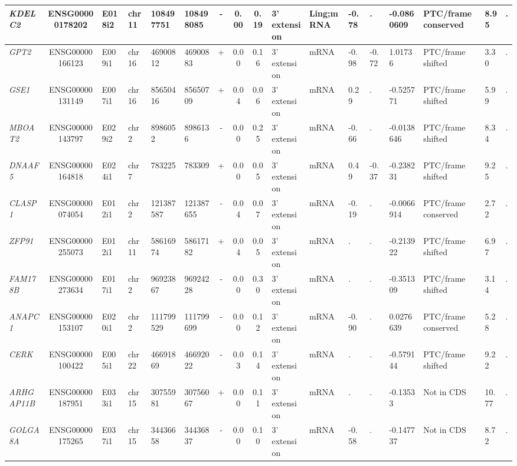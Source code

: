 \begin{appendices}
\begin{landscape}
\begin{table}
{\begin{tabular}{|l|c|l|l|l|l|c|c|c|l|l|l|l|l|l|l|l|}
		\textit{KDELC2} & ENSG00000178202 & E018i2 & chr11 & 108497751 & 108498085 & -     & 0.00  & 0.19  & 3' extension & Ling;mRNA & -0.78 & . & -0.0860609 & PTC/frame conserved & 8.95  & . \\ \hline
		\textit{GPT2} & ENSG00000166123 & E009i1 & chr16 & 46900812 & 46900883 & +     & 0.00  & 0.16  & 3' extension & mRNA  & -0.98 & -0.72 & 1.01736 & PTC/frame shifted & 3.30  & . \\ \hline
		\textit{GSE1} & ENSG00000131149 & E007i1 & chr16 & 85650416 & 85650709 & +     & 0.04  & 0.06  & 3' extension & mRNA  & 0.29  & . & -0.525771 & PTC/frame shifted & 5.99  & . \\ \hline
		\textit{MBOAT2} & ENSG00000143797 & E029i2 & chr2  & 8986052 & 8986136 & -     & 0.00  & 0.25  & 3' extension & mRNA  & -0.66 & . & -0.0138646 & PTC/frame shifted & 8.34  & . \\ \hline
		\textit{DNAAF5} & ENSG00000164818 & E024i1 & chr7  & 783225 & 783309 & +     & 0.00  & 0.05  & 3' extension & mRNA  & 0.49  & -0.37 & -0.238231 & PTC/frame shifted & 9.25  & . \\ \hline
		\textit{CLASP1} & ENSG00000074054 & E012i1 & chr2  & 121387587 & 121387655 & -     & 0.04  & 0.07  & 3' extension & mRNA  & -0.19 & . & -0.0066914 & PTC/frame conserved & 2.72  & . \\ \hline
		\textit{ZFP91} & ENSG00000255073 & E012i1 & chr11 & 58616974 & 58617182 & +     & 0.04  & 0.05  & 3' extension & mRNA  & . & . & -0.213922 & PTC/frame shifted & 6.97  & . \\ \hline
		\textit{FAM178B} & ENSG00000273634 & E017i1 & chr2  & 96923867 & 96924228 & -     & 0.00  & 0.30  & 3' extension & mRNA  & . & . & -0.351309 & PTC/frame shifted & 3.14  & . \\  \hline
		\textit{ANAPC1} & ENSG00000153107 & E020i1 & chr2  & 111799529 & 111799699 & -     & 0.00  & 0.12  & 3' extension & mRNA  & -0.90 & . & 0.0276639 & PTC/frame conserved & 5.28  & . \\ \hline
		\textit{CERK} & ENSG00000100422 & E005i1 & chr22 & 46691869 & 46692022 & -     & 0.03  & 0.14  & 3' extension & mRNA  & . & . & -0.579144 & PTC/frame shifted & 9.22  & . \\ \hline
		\textit{ARHGAP11B} & ENSG00000187951 & E033i1 & chr15 & 30755981 & 30756067 & +     & 0.00  & 0.11  & 3' extension & mRNA  & . & . & -0.13533 & Not in CDS     & 10.77 & . \\ \hline
		\textit{GOLGA8A} & ENSG00000175265 & E037i1 & chr15 & 34436658 & 34436837 & -     & 0.00  & 0.10  & 3' extension & mRNA  & -0.58 & . & -0.147737 & Not in CDS     & 8.72  & . \\ \hline

\end{tabular}}
\end{table}
\end{landscape}
\end{appendices}
